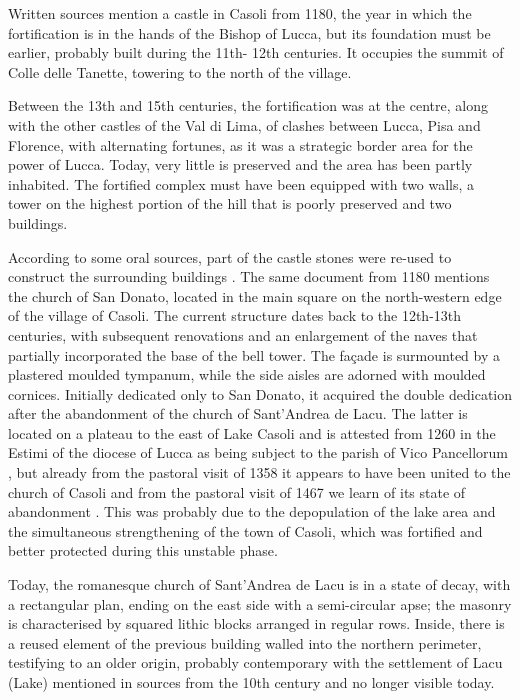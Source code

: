 \documentclass[sustainability,article,submit,pdftex,moreauthors]{Definitions/mdpi}
\begin{document}
Written sources mention a castle in Casoli from 1180, the year in which the fortification is in the hands of the Bishop of Lucca, but its foundation must be earlier, probably built during the 11th- 12th centuries. It occupies the summit of Colle delle Tanette, towering to the north of the village.

Between the 13th and 15th centuries, the fortification was at the centre, along with the other castles of the Val di Lima, of clashes between Lucca, Pisa and Florence, with alternating fortunes, as it was a strategic border area for the power of Lucca. Today, very little is preserved and the area has been partly inhabited. The fortified complex must have been equipped with
two walls, a tower on the highest portion of the hill that is poorly preserved and two buildings.

According to some oral sources, part of the castle stones were re-used to construct the surrounding buildings \cite{gia96, for12, rom16}. The same document from 1180 mentions the church of San Donato, located in the main square on the north-western edge of the village of Casoli. The current structure dates back to the 12th-13th centuries, with subsequent renovations and an enlargement of the naves that partially incorporated the base of the bell tower. The façade is surmounted by a plastered moulded tympanum, while the side aisles are adorned with moulded cornices. Initially dedicated only to San Donato, it acquired the double dedication after the abandonment of the church of Sant'Andrea de Lacu. The latter is located on a plateau to the east of Lake Casoli and is attested from 1260 in the Estimi of the diocese of Lucca as being subject to the parish of Vico Pancellorum \cite{ber18, gia96, cap17}, but already from the pastoral visit of 1358 it appears to have been united to the church of Casoli and from the pastoral visit of 1467 we learn of its state of abandonment \cite{gia96, con12}. This was probably due to the depopulation of the lake area and the simultaneous strengthening of the town of Casoli, which was fortified and better protected during this unstable phase.

Today, the romanesque church of Sant'Andrea de Lacu is in a state of decay, with a rectangular plan, ending on the east side with a semi-circular apse; the masonry is characterised by squared lithic blocks arranged in regular rows. Inside, there is a reused element of the previous building walled into the northern perimeter, testifying to an older origin, probably contemporary with the settlement of Lacu (Lake) mentioned in sources from the 10th century and no longer visible today.
\end{document}

